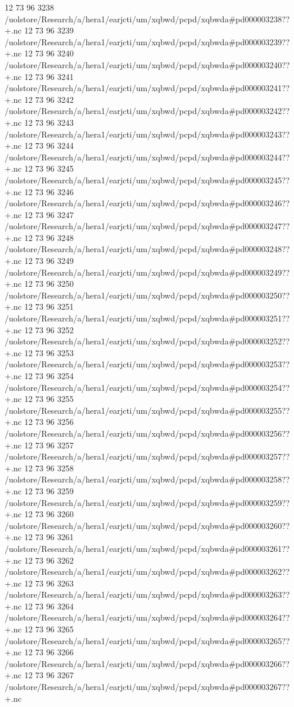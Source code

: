 12 73 96
3238
/uolstore/Research/a/hera1/earjcti/um/xqbwd/pcpd/xqbwda#pd000003238??+.nc
12 73 96
3239
/uolstore/Research/a/hera1/earjcti/um/xqbwd/pcpd/xqbwda#pd000003239??+.nc
12 73 96
3240
/uolstore/Research/a/hera1/earjcti/um/xqbwd/pcpd/xqbwda#pd000003240??+.nc
12 73 96
3241
/uolstore/Research/a/hera1/earjcti/um/xqbwd/pcpd/xqbwda#pd000003241??+.nc
12 73 96
3242
/uolstore/Research/a/hera1/earjcti/um/xqbwd/pcpd/xqbwda#pd000003242??+.nc
12 73 96
3243
/uolstore/Research/a/hera1/earjcti/um/xqbwd/pcpd/xqbwda#pd000003243??+.nc
12 73 96
3244
/uolstore/Research/a/hera1/earjcti/um/xqbwd/pcpd/xqbwda#pd000003244??+.nc
12 73 96
3245
/uolstore/Research/a/hera1/earjcti/um/xqbwd/pcpd/xqbwda#pd000003245??+.nc
12 73 96
3246
/uolstore/Research/a/hera1/earjcti/um/xqbwd/pcpd/xqbwda#pd000003246??+.nc
12 73 96
3247
/uolstore/Research/a/hera1/earjcti/um/xqbwd/pcpd/xqbwda#pd000003247??+.nc
12 73 96
3248
/uolstore/Research/a/hera1/earjcti/um/xqbwd/pcpd/xqbwda#pd000003248??+.nc
12 73 96
3249
/uolstore/Research/a/hera1/earjcti/um/xqbwd/pcpd/xqbwda#pd000003249??+.nc
12 73 96
3250
/uolstore/Research/a/hera1/earjcti/um/xqbwd/pcpd/xqbwda#pd000003250??+.nc
12 73 96
3251
/uolstore/Research/a/hera1/earjcti/um/xqbwd/pcpd/xqbwda#pd000003251??+.nc
12 73 96
3252
/uolstore/Research/a/hera1/earjcti/um/xqbwd/pcpd/xqbwda#pd000003252??+.nc
12 73 96
3253
/uolstore/Research/a/hera1/earjcti/um/xqbwd/pcpd/xqbwda#pd000003253??+.nc
12 73 96
3254
/uolstore/Research/a/hera1/earjcti/um/xqbwd/pcpd/xqbwda#pd000003254??+.nc
12 73 96
3255
/uolstore/Research/a/hera1/earjcti/um/xqbwd/pcpd/xqbwda#pd000003255??+.nc
12 73 96
3256
/uolstore/Research/a/hera1/earjcti/um/xqbwd/pcpd/xqbwda#pd000003256??+.nc
12 73 96
3257
/uolstore/Research/a/hera1/earjcti/um/xqbwd/pcpd/xqbwda#pd000003257??+.nc
12 73 96
3258
/uolstore/Research/a/hera1/earjcti/um/xqbwd/pcpd/xqbwda#pd000003258??+.nc
12 73 96
3259
/uolstore/Research/a/hera1/earjcti/um/xqbwd/pcpd/xqbwda#pd000003259??+.nc
12 73 96
3260
/uolstore/Research/a/hera1/earjcti/um/xqbwd/pcpd/xqbwda#pd000003260??+.nc
12 73 96
3261
/uolstore/Research/a/hera1/earjcti/um/xqbwd/pcpd/xqbwda#pd000003261??+.nc
12 73 96
3262
/uolstore/Research/a/hera1/earjcti/um/xqbwd/pcpd/xqbwda#pd000003262??+.nc
12 73 96
3263
/uolstore/Research/a/hera1/earjcti/um/xqbwd/pcpd/xqbwda#pd000003263??+.nc
12 73 96
3264
/uolstore/Research/a/hera1/earjcti/um/xqbwd/pcpd/xqbwda#pd000003264??+.nc
12 73 96
3265
/uolstore/Research/a/hera1/earjcti/um/xqbwd/pcpd/xqbwda#pd000003265??+.nc
12 73 96
3266
/uolstore/Research/a/hera1/earjcti/um/xqbwd/pcpd/xqbwda#pd000003266??+.nc
12 73 96
3267
/uolstore/Research/a/hera1/earjcti/um/xqbwd/pcpd/xqbwda#pd000003267??+.nc
